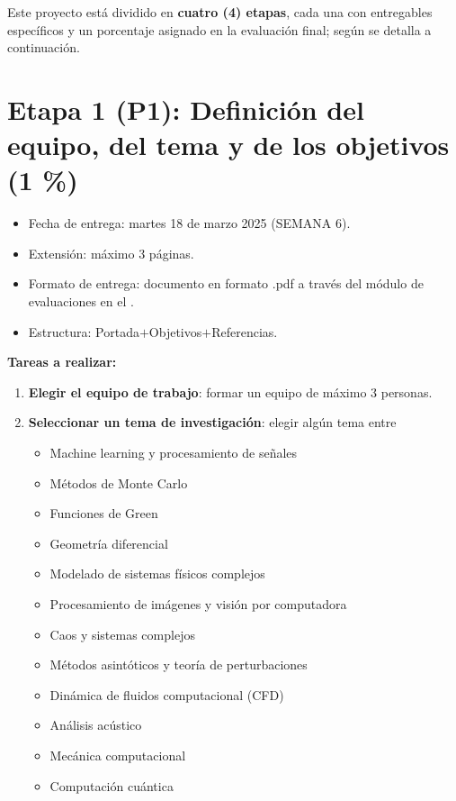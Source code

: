 Este proyecto está dividido en \textbf{\textcolor{c1}{cuatro (4) etapas}}, cada una con entregables específicos y un porcentaje asignado en la evaluación final; seg\'un se detalla a continuaci\'on.

\section*{Etapa 1 (P1): Definici\'on del equipo, del tema y de los objetivos (1 \%)}

\begin{itemize}
    \item[\checkmark] Fecha de entrega: martes 18 de marzo 2025 (SEMANA 6).
    \item[\checkmark] Extensi\'on:  m\'aximo 3 p\'aginas.
    \item[\checkmark] Formato de entrega: documento en formato .pdf a través del módulo de evaluaciones en el \td.
    \item[\checkmark] Estructura: Portada$+$Objetivos$+$Referencias.
\end{itemize}


\textbf{Tareas a realizar:}

\begin{enumerate}
    \item \textbf{Elegir el equipo de trabajo}: formar un equipo de máximo 3 personas. 
    \item \textbf{Seleccionar un tema de investigaci\'on}: elegir alg\'un tema entre
    \begin{itemize}
        \item Machine learning y procesamiento de señales
        \item Métodos de Monte Carlo
        \item Funciones de Green
        \item Geometr\'ia diferencial
        \item Modelado de sistemas físicos complejos 
        \item Procesamiento de imágenes y visión por computadora
        \item Caos y sistemas complejos
        \item M\'etodos asint\'oticos y teor\'ia de perturbaciones
        \item Dinámica de fluidos computacional (CFD)
        \item An\'alisis ac\'ustico
        \item Mec\'anica computacional
        \item Computaci\'on cu\'antica
    \end{itemize}
\end{enumerate}


